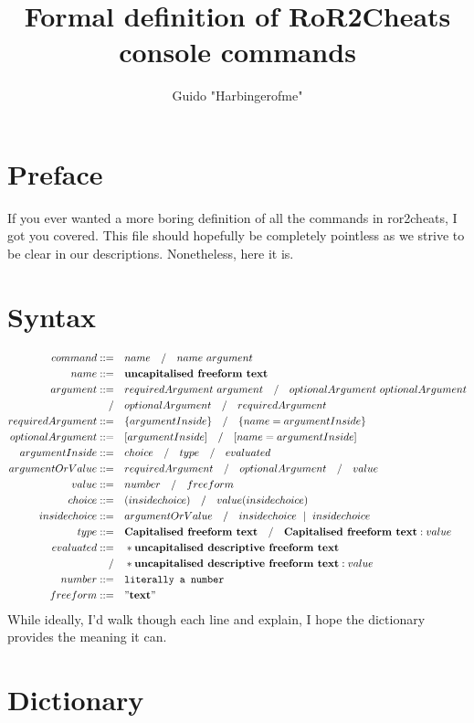 \documentclass{article}
\title{Formal definition of RoR2Cheats console commands}
\author{Guido "Harbingerofme"}
\begin{document}
\maketitle
\section*{Preface}
If you ever wanted a more boring definition of all the commands in ror2cheats, I got you covered.
 This file should hopefully be completely pointless as we strive to be clear in our descriptions.
 Nonetheless, here it is.
\section{Syntax}
\begin{align*}
    command ::= &\quad name \quad/\quad name\text{ }argument\\
    name ::= &\quad \textbf{uncapitalised freeform text}\\
    argument ::= &\quad requiredArgument\text{ }argument \quad/\quad optionalArgument\text{ }optionalArgument\\
    /&\quad optionalArgument \quad/\quad requiredArgument\\
    requiredArgument ::= &\quad \{argumentInside\} \quad/\quad \{name=argumentInside\}\\
    optionalArgument ::= &\quad [argumentInside] \quad/\quad [name=argumentInside]\\
    argumentInside ::= &\quad choice \quad/\quad type \quad/\quad evaluated\\
    argumentOrValue ::= &\quad requiredArgument \quad/\quad optionalArgument \quad/\quad value\\
    value ::= &\quad number \quad/\quad freeform \\
    choice ::=  &\quad (insidechoice) \quad/\quad value(insidechoice)\\
    insidechoice ::= &\quad argumentOrValue \quad/\quad insidechoice\text{ }\mid\text{ }insidechoice\\
    type ::=  &\quad \textbf{Capitalised freeform text} \quad/\quad \textbf{Capitalised freeform text}:value\\
    evaluated ::= &\quad *\textbf{uncapitalised descriptive freeform text}\\
    /&\quad *\textbf{uncapitalised descriptive freeform text}:value\\
    number ::= &\quad \texttt{literally a number}\\
    freeform ::= &\quad "\textbf{text}"
\end{align*}
While ideally, I'd walk though each line and explain, I hope the dictionary provides the meaning it can.
\section{Dictionary}
\end{document}
